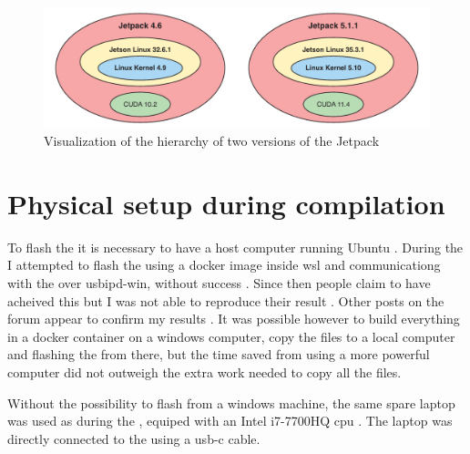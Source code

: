 \begin{figure}[H]
    \centering
    \includegraphics[width=\textwidth]{figures/jetpack_hierarchy/hierarchy.pdf}
    \caption{Visualization of the hierarchy of two versions of the Jetpack\cite{nvidiaJetPackSDK2022}\cite{nvidiaJetPackSDK2023}}
    \label{fig:jetpack_hierarchy}
\end{figure}

\section{Physical setup during compilation}
To flash the \jx it is necessary to have a host computer running Ubuntu \cite{nvidiaSDKManager2019}.
During the \preproject I attempted to flash the \jx using a docker image inside \gls{wsl} and communicationg with the \jx over usbipd-win, without success \cite{martensPortableSensorRig2022} \cite{nvidiaSDKManager2019} \cite{dorsselaerUsbipdwin2023}.
Since then people claim to have acheived this but I was not able to reproduce their result \jx \cite{makinbacon21TUTORIALUsingSdkmanager2022}.
Other posts on the forum appear to confirm my results \cite{2008PleaseProvideMore2022}.
It was possible however to build everything in a docker container on a windows computer, copy the files to a local computer and flashing the \jx from there,
but the time saved from using a more powerful computer did not outweigh the extra work needed to copy all the files.

Without the possibility to flash from a windows machine, the same spare laptop was used as during the \preproject, equiped with an Intel i7-7700HQ \gls{cpu} \cite{martensPortableSensorRig2022}.
The laptop was directly connected to the \jx using a usb-c cable.



